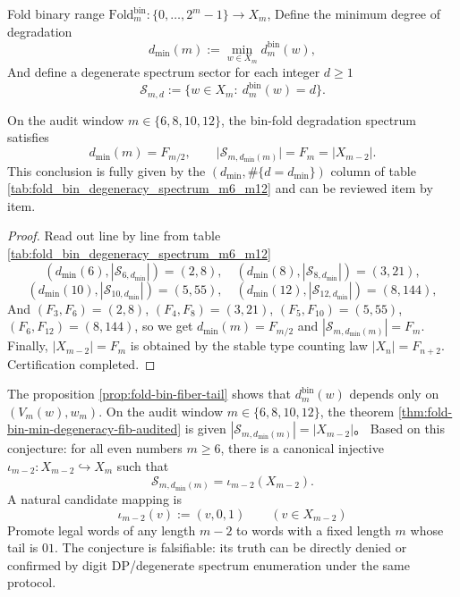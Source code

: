 \begin{definition}\label{def:fold-bin-degeneracy-sectors}
Fold binary range \(\mathrm{Fold}^{\mathrm{bin}}_m:\{0,\dots,2^m-1\}\to X_m\),
Define the minimum degree of degradation
\[
d_{\min}(m):=\min_{w\in X_m} d^{\mathrm{bin}}_m(w),
\]
And define a degenerate spectrum sector for each integer \(d\ge 1\)
\[
\mathcal{S}_{m,d}:=\{w\in X_m:\ d^{\mathrm{bin}}_m(w)=d\}.
\]
\end{definition}

\begin{theorem}\label{thm:fold-bin-min-degeneracy-fib-audited}
On the audit window \(m\in\{6,8,10,12\}\), the bin-fold degradation spectrum satisfies
\[
d_{\min}(m)=F_{m/2},
\qquad
\bigl|\mathcal{S}_{m,d_{\min}(m)}\bigr|=F_m=|X_{m-2}|.
\]
This conclusion is fully given by the \((d_{\min},\#\{d=d_{\min}\})\) column of table \ref{tab:fold_bin_degeneracy_spectrum_m6_m12} and can be reviewed item by item.
\end{theorem}
\begin{proof}
Read out line by line from table \ref{tab:fold_bin_degeneracy_spectrum_m6_m12}
\[
(d_{\min}(6),|\mathcal{S}_{6,d_{\min}}|)=(2,8),\quad
(d_{\min}(8),|\mathcal{S}_{8,d_{\min}}|)=(3,21),
\]
\[
(d_{\min}(10),|\mathcal{S}_{10,d_{\min}}|)=(5,55),\quad
(d_{\min}(12),|\mathcal{S}_{12,d_{\min}}|)=(8,144),
\]
And \((F_{3},F_{6})=(2,8)\), \((F_{4},F_{8})=(3,21)\), \((F_{5},F_{10})=(5,55)\), \((F_{6},F_{12})=(8,144)\), so we get \(d_{\min}(m)=F_{m/2}\) and \(|\mathcal{S}_{m,d_{\min}(m)}|=F_m\).
Finally, \(|X_{m-2}|=F_m\) is obtained by the stable type counting law \(|X_n|=F_{n+2}\). Certification completed.
\end{proof}

\begin{conjecture}\label{conj:fold-bin-min-sector-regular-subcover}
The proposition \ref{prop:fold-bin-fiber-tail} shows that \(d^{\mathrm{bin}}_m(w)\) depends only on \((V_m(w),w_m)\).
On the audit window \(m\in\{6,8,10,12\}\), the theorem \ref{thm:fold-bin-min-degeneracy-fib-audited} is given
\(
|\mathcal{S}_{m,d_{\min}(m)}|=|X_{m-2}|
\)。
Based on this conjecture: for all even numbers \(m\ge 6\), there is a canonical injective \(\iota_{m-2}:X_{m-2}\hookrightarrow X_m\) such that
\[
\mathcal{S}_{m,d_{\min}(m)}=\iota_{m-2}(X_{m-2}).
\]
A natural candidate mapping is
\[
\iota_{m-2}(v):=(v,0,1)\qquad (v\in X_{m-2})
\]
Promote legal words of any length \(m-2\) to words with a fixed length \(m\) whose tail is \(01\).
The conjecture is falsifiable: its truth can be directly denied or confirmed by digit DP/degenerate spectrum enumeration under the same protocol.
\end{conjecture}

